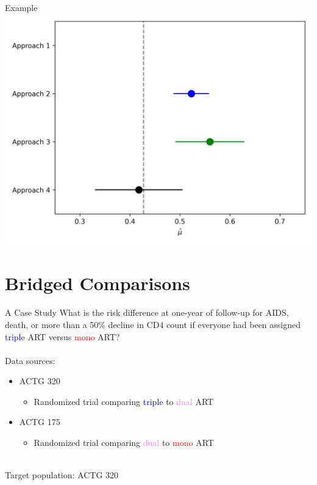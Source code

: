\documentclass{beamer}
\newcommand{\blue}[1]{\textcolor{blue}{#1}}
\newcommand{\red}[1]{\textcolor{red}{#1}}
\newcommand{\violet}[1]{\textcolor{violet}{#1}}
\begin{document}
\begin{frame}{Example}
	\centering
	\includegraphics[scale=0.6]{code/didactic_example.png}	
\end{frame}

\section{Bridged Comparisons}

\begin{frame}{A Case Study}
	What is the risk difference at one-year of follow-up for AIDS, death, or more than a 50\% decline in CD4 count if everyone had been assigned \blue{triple} ART versus \red{mono} ART?
	\\~\\
	Data sources:
	\begin{itemize}
		\item ACTG 320
		\begin{itemize}
			\item Randomized trial comparing \blue{triple} to \violet{dual} ART
		\end{itemize}
		\item ACTG 175
		\begin{itemize}
			\item Randomized trial comparing \violet{dual} to \red{mono} ART
		\end{itemize}
	\end{itemize}~\\
	Target population: ACTG 320
\end{frame}
\end{document}
